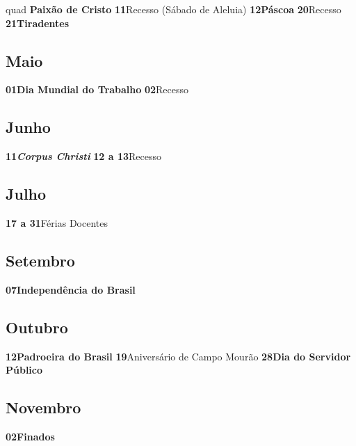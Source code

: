 \documentclass[thesis]{hmcposter}
\begin{document}
\begin{poster}
quad \quad \quad \textbf{Paixão de Cristo} \newline\textbf{11}\quad \quad \quad \quad Recesso (Sábado de Aleluia) \newline\textbf{12}\quad \quad \quad \quad \textbf{Páscoa} \newline\textbf{20}\quad \quad \quad \quad Recesso \newline\textbf{21}\quad \quad \quad \quad \textbf{Tiradentes} \newline\subsection{Maio}\textbf{01}\quad \quad \quad \quad \textbf{Dia Mundial do Trabalho} \newline\textbf{02}\quad \quad \quad \quad Recesso \newline\subsection{Junho}\textbf{11}\quad \quad \quad \quad \textbf{\textit{Corpus Christi}} \newline\textbf{12 a 13}\quad \quad Recesso \newline\subsection{Julho}\textbf{17 a 31}\quad \quad Férias Docentes \newline\subsection{Setembro}\textbf{07}\quad \quad \quad \quad \textbf{Independência do Brasil} \newline\subsection{Outubro}\textbf{12}\quad \quad \quad \quad \textbf{Padroeira do Brasil} \newline\textbf{19}\quad \quad \quad \quad Aniversário de Campo Mourão \newline\textbf{28}\quad \quad \quad \quad \textbf{Dia do Servidor Público} \newline\subsection{Novembro}\textbf{02}\quad \quad \quad \quad \textbf{Finados} 
\end{poster}
\end{document}
